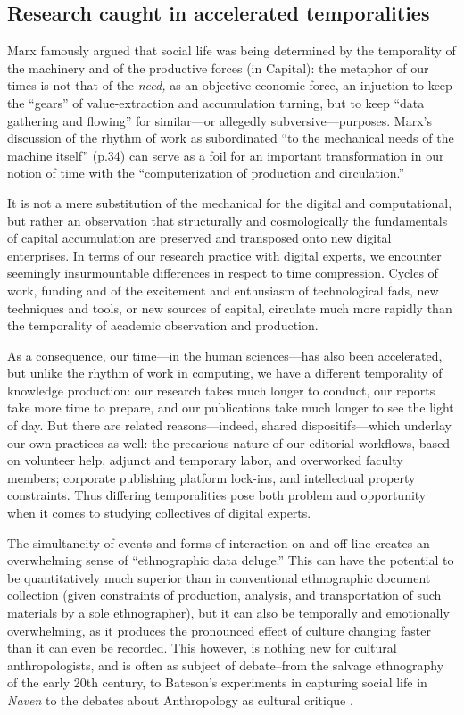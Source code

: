 \documentclass[10pt,letter,oneside]{scrartcl}
\begin{document}
\subsection*{Research caught in accelerated  temporalities} 

Marx famously argued that social life was being determined by the temporality 
of the machinery and of the productive forces (in Capital):
the metaphor of our times is not that of the \emph{need,} as an
objective economic force, an injuction to keep the ``gears'' of
value-extraction and accumulation turning, but to keep ``data
gathering and flowing'' for similar---or allegedly subversive---purposes. 
Marx's discussion of the rhythm of work as subordinated ``to the 
mechanical needs of the machine itself'' \cite{Marx1990} (p.34) can serve 
as a foil for an important transformation in our notion of time with
the ``computerization of production and circulation.'' 

It is not a mere substitution of the mechanical for the digital and
computational, but rather an observation that structurally and
cosmologically the fundamentals of capital accumulation are preserved
and transposed onto new digital enterprises.  In terms of our research
practice with digital experts, we encounter seemingly insurmountable
differences in respect to time compression. Cycles of work, funding
and of the excitement and enthusiasm of technological fads, new
techniques and tools, or new sources of capital, circulate much more
rapidly than the temporality of academic observation and production.

As a consequence, our time---in the human sciences---has also been
accelerated, but unlike the rhythm of work in computing, we
have a different temporality of knowledge production: our research
takes much longer to conduct, our reports take more time to prepare,
and our publications take much longer to see the light of day.  But
there are related reasons---indeed, shared dispositifs---which
underlay our own practices as well: the precarious nature of our
editorial workflows, based on volunteer help, adjunct and temporary
labor, and overworked faculty members; corporate publishing platform
lock-ins, and intellectual property constraints.  Thus differing
temporalities pose both problem and opportunity when it comes to
studying collectives of digital experts.

The simultaneity of events and forms of interaction on and
off line creates an overwhelming sense of ``ethnographic data
deluge.''  This can have the potential to be quantitatively much superior than in
conventional ethnographic document collection (given constraints of
production, analysis, and transportation of such materials by a sole
ethnographer), but it can also be temporally and emotionally
overwhelming, as it produces the pronounced effect of culture changing
faster than it can even be recorded.  This however, is nothing new for
cultural anthropologists, and is often as subject of debate--from the
salvage ethnography of the early 20th century, to Bateson's
experiments in capturing social life in \emph{Naven}
\cite{Bateson1958,Marcus1985} to the debates about Anthropology as
cultural critique \cite{Marcus1999a,Clifford1986}.
\end{document}
